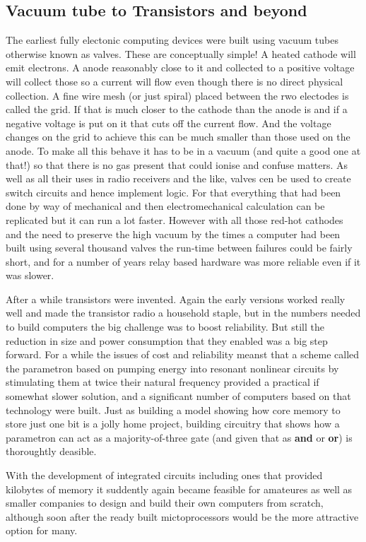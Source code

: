 \subsection{Vacuum tube to Transistors and beyond}
The earliest fully electonic computing devices were built using vacuum
tubes otherwise known as valves. These are conceptually simple! A heated
cathode will emit electrons. A anode reasonably close to it and collected
to a positive voltage will collect those so a current will flow even though
there is no direct physical collection. A fine wire mesh (or just spiral)
placed between the rwo electodes is called the grid. If that is much closer to
the cathode than the anode is and if a negative voltage is put on it
that cuts off the current flow. And the voltage changes on the grid to achieve
this can be much smaller than those used on the anode. To make all this
behave it has to be in a vacuum (and quite a good one at that!) so that there
is no gas present that could ionise and confuse matters. As well as all their
uses in radio receivers and the like, valves cen be used to create switch
circuits and hence implement logic. For that everything that had been done
by way of mechanical and then electromechanical calculation can be replicated
but it can run a lot faster. However with all those red-hot cathodes
and the need to preserve the high vacuum by the times a computer had
been built using several thousand valves the run-time between failures could
be fairly short, and for a number of years relay based hardware was
more reliable even if it was slower.

After a while transistors were invented. Again the early versions worked
really well and made the transistor radio a household staple, but in the
numbers needed to build computers the big challenge was to boost reliability.
But still the reduction in size and power consumption that they enabled
was a big step forward. For a while the issues of cost and reliability
meanst that a scheme called the parametron\cite{gotoparametron} based on
pumping energy into resonant nonlinear circuits by stimulating them at twice
their natural frequency provided a practical if somewhat slower solution, and
a significant number of computers based on that technology were built. Just
as building a model showing how core memory to store just one bit is
a jolly home project, building circuitry that shows how a parametron can
act as a majority-of-three gate (and given that as \textbf{and} or
\textbf{or}) is thoroughtly deasible.

With the development of integrated circuits including ones that provided
kilobytes of memory it suddently again became feasible for amateures as well
as smaller companies to design and build their own computers from scratch,
although soon after the ready built mictoprocessors would be the more
attractive option for many.

